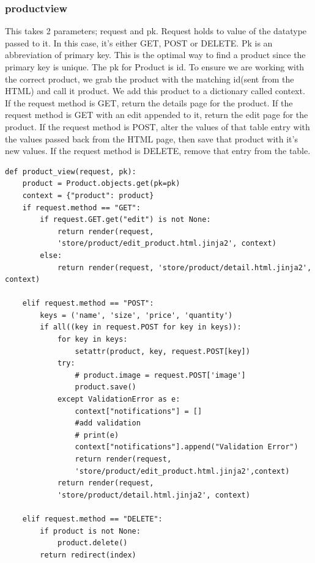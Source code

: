 \subsubsection{product\textunderscore view}
This takes 2 parameters; request and pk. Request holds to value of the datatype passed to it. In this case, it's either GET, POST or DELETE. Pk is an abbreviation of primary key. This is the optimal way to find a product since the primary key is unique. The pk for Product is id.
To ensure we are working with the correct product, we grab the product with the matching id(sent from the HTML) and call it product. We add this product to a dictionary called context.
If the request method is GET, return the details page for the product.
If the request method is GET with an edit appended to it, return the edit page for the product.
If the request method is POST, alter the values of that table entry with the values passed back from the HTML page, then save that product with it's new values.
If the request method is DELETE, remove that entry from the table.
\begin{verbatim}
def product_view(request, pk):
    product = Product.objects.get(pk=pk)
    context = {"product": product}
    if request.method == "GET":
        if request.GET.get("edit") is not None:
            return render(request,
            'store/product/edit_product.html.jinja2', context)
        else:
            return render(request, 'store/product/detail.html.jinja2', context)

    elif request.method == "POST":
        keys = ('name', 'size', 'price', 'quantity')
        if all((key in request.POST for key in keys)):
            for key in keys:
                setattr(product, key, request.POST[key])
            try:
                # product.image = request.POST['image']
                product.save()
            except ValidationError as e:
                context["notifications"] = []
                #add validation
                # print(e)
                context["notifications"].append("Validation Error")
                return render(request,
                'store/product/edit_product.html.jinja2',context)
            return render(request,
            'store/product/detail.html.jinja2', context)

    elif request.method == "DELETE":
        if product is not None:
            product.delete()
        return redirect(index)
\end{verbatim}
